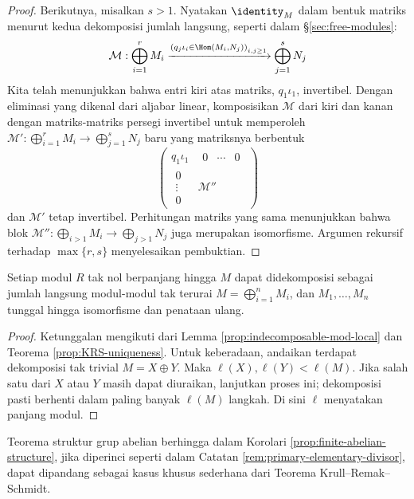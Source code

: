 \begin{proof}
Berikutnya, misalkan $s > 1$. Nyatakan $\identity_M$ dalam bentuk matriks menurut kedua dekomposisi jumlah langsung, seperti dalam \S\ref{sec:free-modules}:
	\[ \mathcal{M}: \bigoplus_{i=1}^r M_i \xrightarrow{\left( q_j \iota_i \in \Hom(M_i, N_j) \right)_{i,j \geq 1}} \bigoplus_{j=1}^s N_j \]
Kita telah menunjukkan bahwa entri kiri atas matriks, $q_1 \iota_1$, invertibel. Dengan eliminasi yang dikenal dari aljabar linear, komposisikan $\mathcal{M}$ dari kiri dan kanan dengan matriks-matriks persegi invertibel untuk memperoleh $\mathcal{M}': \bigoplus_{i=1}^r M_i \to \bigoplus_{j=1}^s N_j$ baru yang matriksnya berbentuk
	\[ \begin{pmatrix}
		q_1 \iota_1 & \begin{array}{ccc} 0 & \cdots & 0 \end{array} \\
		\begin{array}{c} 0 \\ \vdots \\ 0 \end{array} & \mathcal{M}''
	\end{pmatrix} \]
dan $\mathcal{M'}$ tetap invertibel. Perhitungan matriks yang sama menunjukkan bahwa blok $\mathcal{M}'': \bigoplus_{i>1} M_i \to \bigoplus_{j>1} N_j$ juga merupakan isomorfisme. Argumen rekursif terhadap $\max\{r,s\}$ menyelesaikan pembuktian.
\end{proof}

\begin{corollary}
	Setiap modul $R$ tak nol berpanjang hingga $M$ dapat didekomposisi sebagai jumlah langsung modul-modul tak terurai $M = \bigoplus_{i=1}^n M_i$, dan $M_1, \ldots, M_n$ tunggal hingga isomorfisme dan penataan ulang.
\end{corollary}
\begin{proof}
Ketunggalan mengikuti dari Lemma \ref{prop:indecomposable-mod-local} dan Teorema \ref{prop:KRS-uniqueness}. Untuk keberadaan, andaikan terdapat dekomposisi tak trivial $M = X \oplus Y$. Maka $\ell(X), \ell(Y) < \ell(M)$. Jika salah satu dari $X$ atau $Y$ masih dapat diuraikan, lanjutkan proses ini; dekomposisi pasti berhenti dalam paling banyak $\ell(M)$ langkah. Di sini $\ell$ menyatakan panjang modul.
\end{proof}

Teorema struktur grup abelian berhingga dalam Korolari \ref{prop:finite-abelian-structure}, jika diperinci seperti dalam Catatan \ref{rem:primary-elementary-divisor}, dapat dipandang sebagai kasus khusus sederhana dari Teorema Krull--Remak--Schmidt.

